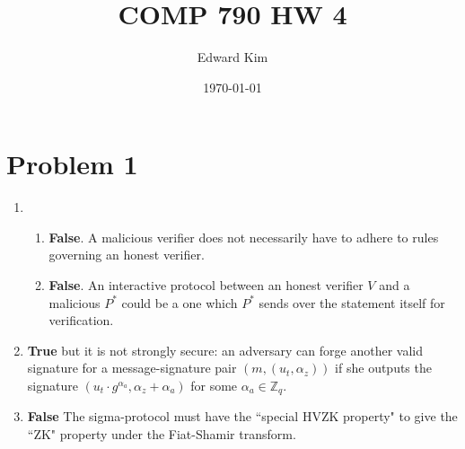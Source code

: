 \documentclass[12pt]{article}%
\begin{document}
\title{COMP 790 HW 4}
\author{Edward Kim}
\date{\today}
\maketitle

\section*{Problem 1}
\begin{enumerate}
  \item
  \begin{enumerate}
    \item {\bf False}. A malicious verifier does not necessarily have to adhere to rules governing an honest verifier.
    \item {\bf False}. An interactive protocol between an honest verifier $V$ and a malicious $P^*$ could be a one which $P^*$ sends over the statement itself for verification.
  \end{enumerate}

  \item
  {\bf True} but it is not strongly secure: an adversary can forge another valid signature for a message-signature pair $(m, (u_t, \alpha_z))$ if she outputs the signature $(u_t \cdot g^{\alpha_a}, \alpha_z + \alpha_a)$ for some $\alpha_a \in \mathbb{Z}_q$.

  \item
  {\bf False} The sigma-protocol must have the ``special HVZK property" to give the ``ZK" property under the Fiat-Shamir transform.
\end{enumerate}
\end{document}
